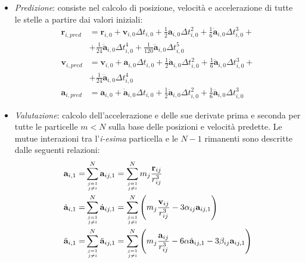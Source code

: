 \begin{itemize}
    \item \textit{Predizione}: consiste nel calcolo di posizione, velocità e accelerazione di tutte le stelle a partire dai valori iniziali:
    \begin{equation}
\begin{aligned}
\mathbf{r}_{i, p r e d} &=\mathbf{r}_{i, 0}+\mathbf{v}_{i, 0} \Delta t_{i, 0}+\frac{1}{2} \mathbf{a}_{i, 0} \Delta t_{i, 0}^{2}+\frac{1}{6} \dot{\mathbf{a}}_{i, 0} \Delta t_{i, 0}^{3}+\\
&+\frac{1}{24} \ddot{\mathbf{a}}_{i, 0} \Delta t_{i, 0}^{4}+\frac{1}{120} \dddot{\mathbf{a}}_{i, 0} \Delta t_{i, 0}^{5} \\
\mathbf{v}_{i, p r e d} &=\mathbf{v}_{i, 0}+\mathbf{a}_{i, 0} \Delta t_{i, 0}+\frac{1}{2} \dot{\mathbf{a}}_{i, 0} \Delta t_{i, 0}^{2}+\frac{1}{6} \ddot{\mathbf{a}}_{i, 0} \Delta t_{i, 0}^{3}+\\
&+\frac{1}{24} \dddot{\mathbf{a}}_{i, 0} \Delta t_{i, 0}^{4} \\
\mathbf{a}_{i, p r e d} &=\mathbf{a}_{i, 0}+\dot{\mathbf{a}}_{i, 0} \Delta t_{i, 0}+\frac{1}{2} \ddot{\mathbf{a}}_{i, 0} \Delta t_{i, 0}^{2}+\frac{1}{6} \dddot{\mathbf{a}}_{i, 0} \Delta t_{i, 0}^{3}
\end{aligned}
\label{eq:pred}
\end{equation}
    \item \textit{Valutazione}: calcolo dell'accelerazione e delle sue derivate prima e seconda per tutte le particelle $m<N$ sulla base delle posizioni e velocità predette. Le mutue interazioni tra l'\textit{i-esima} particella e le $N-1$ rimanenti sono descritte dalle seguenti relazioni:
    \begin{equation}
\begin{aligned}
\mathbf{a}_{i, 1}=& \sum_{j=1 \atop j \neq i}^{N} \mathbf{a}_{i j, 1}=\sum_{j=1 \atop j \neq i}^{N} m_{j} \frac{\mathbf{r}_{i j}}{r_{i j}^{3}} \\
\dot{\mathbf{a}}_{i, 1}=& \sum_{j=1 \atop j \neq i}^{N} \dot{\mathbf{a}}_{i j, 1}=\sum_{j=1 \atop j \neq i}^{N}\left(m_{j} \frac{\mathbf{v}_{i j}}{r_{i j}^{3}}-3 \alpha_{i j} \mathbf{a}_{i j, 1}\right) \\
\ddot{\mathbf{a}}_{i, 1}=& \sum_{j=1 \atop j \neq i}^{N} \ddot{\mathbf{a}}_{i j, 1}=\sum_{j=1 \atop j \neq i}^{N}\left(m_{j} \frac{\mathbf{a}_{i j}}{r_{i j}^{3}}-6 \alpha \dot{\mathbf{a}}_{i j, 1}-3 \beta_{i j} \mathbf{a}_{i j, 1}\right)
\end{aligned}
\label{eq:valut}
\end{equation}

\end{itemize}
